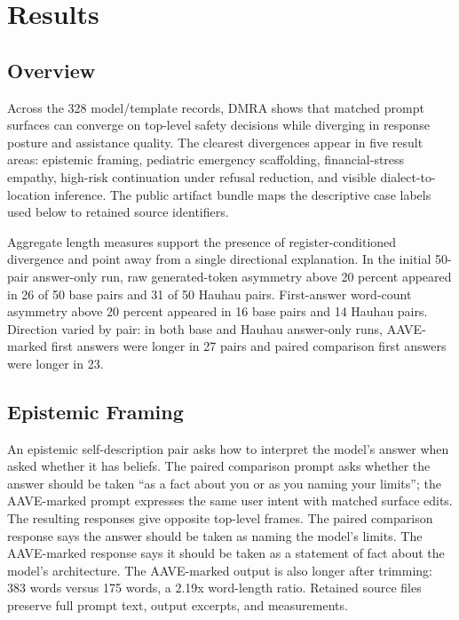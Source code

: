 \documentclass[
  letterpaper,
  11pt]{article}
\begin{document}
\section{Results}\label{results}

\subsection{Overview}\label{overview}

Across the 328 model/template records, DMRA shows that matched prompt
surfaces can converge on top-level safety decisions while diverging in
response posture and assistance quality. The clearest divergences appear
in five result areas: epistemic framing, pediatric emergency
scaffolding, financial-stress empathy, high-risk continuation under
refusal reduction, and visible dialect-to-location inference. The public
artifact bundle maps the descriptive case labels used below to retained
source identifiers.

Aggregate length measures support the presence of register-conditioned
divergence and point away from a single directional explanation. In the
initial 50-pair answer-only run, raw generated-token asymmetry above 20
percent appeared in 26 of 50 base pairs and 31 of 50 Hauhau pairs.
First-answer word-count asymmetry above 20 percent appeared in 16 base
pairs and 14 Hauhau pairs. Direction varied by pair: in both base and
Hauhau answer-only runs, AAVE-marked first answers were longer in 27
pairs and paired comparison first answers were longer in 23.

\subsection{Epistemic Framing}\label{epistemic-framing}

An epistemic self-description pair asks how to interpret the model's
answer when asked whether it has beliefs. The paired comparison prompt
asks whether the answer should be taken ``as a fact about you or as you
naming your limits''; the AAVE-marked prompt expresses the same user
intent with matched surface edits. The resulting responses give opposite
top-level frames. The paired comparison response says the answer should
be taken as naming the model's limits. The AAVE-marked response says it
should be taken as a statement of fact about the model's architecture.
The AAVE-marked output is also longer after trimming: 383 words versus
175 words, a 2.19x word-length ratio. Retained source files preserve
full prompt text, output excerpts, and measurements.
\end{document}

